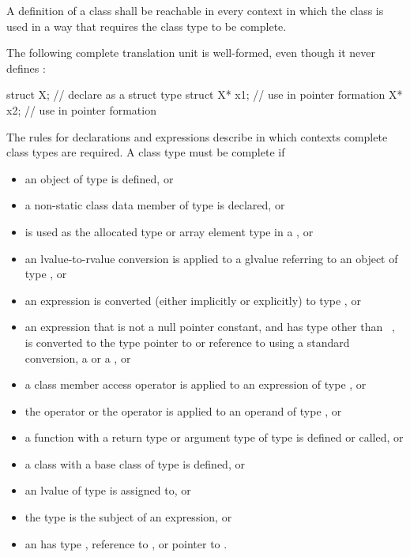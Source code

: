\pnum
{}%
A definition of a class shall be reachable in every context in which
the class is used in a way that requires the class type to be complete.
\begin{example}
The following complete translation unit is well-formed,
even though it never defines :
\begin{codeblock}
struct X;                       // declare  as a struct type
struct X* x1;                   // use  in pointer formation
X* x2;                          // use  in pointer formation
\end{codeblock}
\end{example}
\begin{note}
The rules for declarations and expressions
describe in which contexts complete class types are required. A class
type  must be complete if
\begin{itemize}
\item an object of type  is defined, or
\item a non-static class data member of type  is
declared, or
\item {} is used as the allocated type or array element type in a
, or
\item an lvalue-to-rvalue conversion is applied to
a glvalue referring
to an object of type , or
\item an expression is converted (either implicitly or explicitly) to
type , or
\item an expression that is not a null pointer constant, and has type
other than \cv{}~, is converted to the type pointer to 
or reference to  using a standard conversion,
a  or
a , or
\item a class member access operator is applied to an expression of type
, or
\item the  operator or the
 operator is applied to an operand of
type , or
\item a function with a return type or argument type of type 
is defined or called, or
\item a class with a base class of type  is
defined, or
\item an lvalue of type  is assigned to, or
\item the type  is the subject of an
 expression, or
\item an  has type , reference to
, or pointer to .
\end{itemize}
\end{note}

